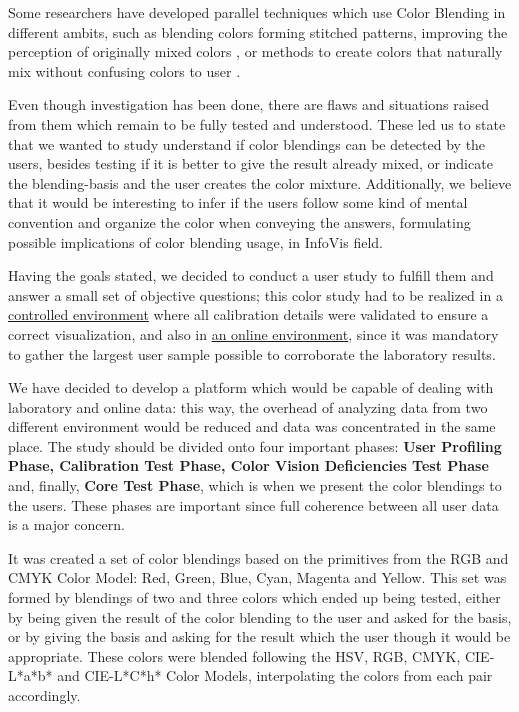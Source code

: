 %
Some researchers have developed parallel techniques which use Color Blending in different
ambits, such as blending colors forming stitched patterns, improving the perception of originally mixed
colors \cite{Urness2003}, or methods to create colors that naturally mix without confusing colors to user \cite{Chuang2009}. \par
%
Even though investigation has been done, there are flaws and situations raised from them which remain to be fully
tested and understood. These led us to state that we wanted to study understand if color blendings can be detected
by the users, besides testing if it is better to give the result already mixed, or indicate the blending-basis and
the user creates the color mixture. Additionally, we believe that it would be interesting to infer if the users follow
some kind of mental convention and organize the color when conveying the answers, formulating possible implications
of color blending usage, in InfoVis field. \par
%
Having the goals stated, we decided to conduct a user study to fulfill them and answer a small set of objective
questions; this color study had to be realized in a \ul{controlled environment} where all calibration
details were validated to ensure a correct visualization, and also in \ul{an online environment}, since it
was mandatory to gather the largest user sample possible to corroborate the laboratory results. \par
%
We have decided to develop a platform which would be capable of dealing with laboratory and online data: this way,
the overhead of analyzing data from two different environment would be reduced and data was concentrated in the same
place. The study should be divided onto four important phases: \textbf{User Profiling Phase, Calibration Test Phase,
Color Vision Deficiencies Test Phase} and, finally, \textbf{Core Test Phase}, which is when we present the color
blendings to the users. These phases are important since full coherence between all user data is a major concern. \par
%
It was created a set of color blendings based on the primitives from the RGB and CMYK Color Model: Red, Green, Blue,
Cyan, Magenta and Yellow. This set was formed by blendings of two and three colors which ended up being tested, either
by being given the result of the color blending to the user and asked for the basis, or by giving the basis and asking
for the result which the user though it would be appropriate. These colors were blended following the HSV, RGB, CMYK,
CIE-L*a*b* and CIE-L*C*h* Color Models, interpolating the colors from each pair accordingly. \par
